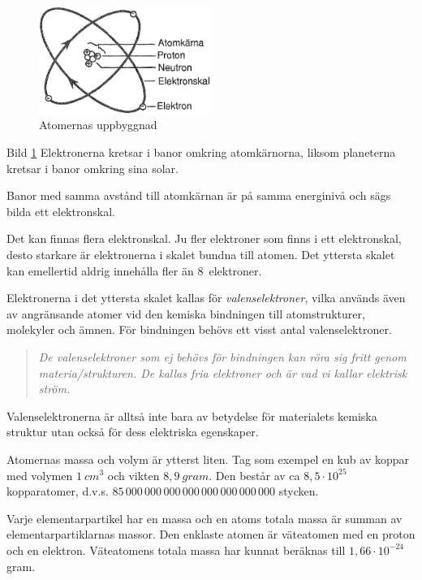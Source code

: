 \begin{figure}
  \includegraphics[width=0.5\textwidth]{images/cropped_pdfs/bild_2_1-01.pdf}
  \caption{Atomernas uppbyggnad}
  \label{fig:BildII1-1}
  \vspace{-20pt}
\end{figure}

Bild \ref{fig:BildII1-1}
Elektronerna kretsar i banor omkring atomkärnorna, liksom
planeterna kretsar i banor omkring sina solar.

Banor med samma avstånd till atomkärnan är på samma energinivå och sägs bilda
ett elektronskal.

Det kan finnas flera elektronskal. Ju fler elektroner som finns i ett
elektronskal, desto starkare är elektronerna i skalet bundna till atomen. Det
yttersta skalet kan emellertid aldrig innehålla fler än 8~elektroner.

Elektronerna i det yttersta skalet kallas för \emph{valenselektroner}, vilka
används även av angränsande atomer vid den kemiska bindningen till
atomstrukturer, molekyler och ämnen. För bindningen behövs ett visst antal
valenselektroner.

\begin{quote}\emph{
De valenselektroner som ej behövs för bindningen kan röra sig fritt genom
materia/strukturen. De kallas fria elektroner och är vad vi kallar elektrisk ström.
}\end{quote}

Valenselektronerna är alltså inte bara av betydelse för materialets kemiska
struktur utan också för dess elektriska egenskaper.

Atomernas massa och volym är ytterst liten. Tag som exempel en kub av koppar
med volymen \(1\ cm^3\) och vikten \(8,9\ gram\). Den består av ca \(8,5 \cdot 10^{25}\) kopparatomer, d.v.s. \(85\, 000\, 000\, 000\, 000\, 000\, 000\, 000\, 000\) stycken.

Varje elementarpartikel har en massa och en atoms totala massa är summan av
elementarpartiklarnas massor. Den enklaste atomen är väteatomen med en proton
och en elektron. Väteatomens totala massa har kunnat beräknas till \(1,66 \cdot 10^{-24}\) gram.

